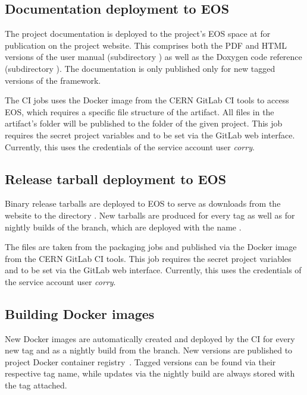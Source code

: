 \subsection{Documentation deployment to EOS}

The project documentation is deployed to the project's EOS space at  for publication on the project website.
This comprises both the PDF and HTML versions of the user manual (subdirectory ) as well as the Doxygen code reference (subdirectory ).
The documentation is only published only for new tagged versions of the framework.

The CI jobs uses the  Docker image from the CERN GitLab CI tools to access EOS, which requires a specific file structure of the artifact.
All files in the artifact's  folder will be published to the  folder of the given project.
This job requires the secret project variables  and  to be set via the GitLab web interface.
Currently, this uses the credentials of the service account user \emph{corry}.

\subsection{Release tarball deployment to EOS}

Binary release tarballs are deployed to EOS to serve as downloads from the website to the directory .
New tarballs are produced for every tag as well as for nightly builds of the  branch, which are deployed with the name .

The files are taken from the packaging jobs and published via the  Docker image from the CERN GitLab CI tools.
This job requires the secret project variables  and  to be set via the GitLab web interface.
Currently, this uses the credentials of the service account user \emph{corry}.

\subsection{Building Docker images}
\label{sec:build-docker}

New \corry Docker images are automatically created and deployed by the CI for every new tag and as a nightly build from the  branch.
New versions are published to project Docker container registry~\cite{corry-container-registry}.
Tagged versions can be found via their respective tag name, while updates via the nightly build are always stored with the  tag attached.

